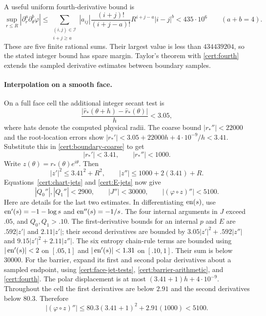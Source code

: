 A useful uniform fourth-derivative bound is
\begin{equation}\label{cert:fourth}
 \sup_{r\leq R}|\partial_r^a\partial_\theta^b\varphi|
 \leq\sum_{\substack{(i,j)\in\mathcal I\\i+j\geq a}}
 |a_{ij}|\frac{(i+j)!}{(i+j-a)!}R^{i+j-a}|i-j|^b
 <435\cdot10^6\qquad(a+b=4).
\end{equation}
These are five finite rational sums.  Their largest value is less than
$434439204$, so the stated integer bound has spare margin.  Taylor's
theorem with \eqref{cert:fourth} extends the sampled derivative estimates
between boundary samples.

\paragraph{Interpolation on a smooth face.}
On a full face cell the additional integer secant test is
\[
 \frac{|\widehat r_*(\theta+h)-\widehat r_*(\theta)|}{h}<3.05,
\]
where hats denote the computed physical radii.  The coarse bound
$|r_*''|<22000$ and the root-location errors show
$|r_*'|<3.05+22000h+4\cdot10^{-9}/h<3.41$.  Substitute this in
\eqref{cert:boundary-coarse} to get
\begin{equation}\label{cert:boundary-fine}
 |r_*'|<3.41,\qquad |r_*''|<1000.
\end{equation}
Write $z(\theta)=r_*(\theta)e^{i\theta}$.  Then
\[
 |z'|^2\leq3.41^2+R^2,\qquad |z''|\leq1000+2(3.41)+R.
\]
Equations~\eqref{cert:chart-jets} and \eqref{cert:E-jets} now give
\begin{equation}\label{cert:face-curvature}
 |Q_0''|,|Q_1''|<2900,\qquad |J''|<30000,\qquad
 |(\varphi\circ z)''|<5100.
\end{equation}
Here are details for the last two estimates.  In differentiating $\operatorname{en}(s)$,
use $\operatorname{en}'(s)=-1-\log s$ and $\operatorname{en}''(s)=-1/s$.
The four internal arguments in $J$ exceed $.05$, and $Q_0,Q_1>.10$.
The first-derivative bounds for an internal $p$ and $E$ are
$.592|z'|$ and $2.11|z'|$; their second derivatives are bounded by
$3.05|z'|^2+.592|z''|$ and $9.15|z'|^2+2.11|z''|$.
The six entropy chain-rule terms are bounded using
$|\operatorname{en}'(s)|<2$ on $[.05,1]$ and $|\operatorname{en}'(s)|<1.31$ on $[.10,1]$.
Their sum is below 30000.  For the barrier, expand its first and second
polar derivatives about a sampled endpoint, using
\eqref{cert:face-jet-tests}, \eqref{cert:barrier-arithmetic}, and
\eqref{cert:fourth}.  The polar displacement is at most
$(3.41+1)h+4\cdot10^{-9}$.  Throughout the cell the first derivatives
are below $2.91$ and the second derivatives below $80.3$.  Therefore
\[
 |(\varphi\circ z)''|
 \leq80.3(3.41+1)^2+2.91(1000)<5100.
\]

